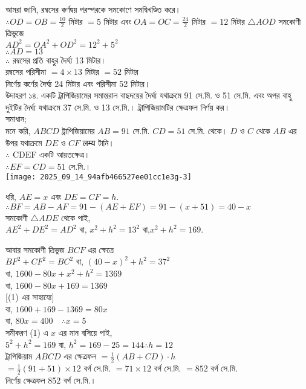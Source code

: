 \documentclass[10pt]{article}
\begin{document}
আমরা জানি, রম্বসের কর্ণদ্বয় পরস্পরকে সমকোণে সমদ্বিখণ্ডিত করে।\\
\(\therefore O D=O B=\frac{10}{2}\) মিটার \(=5\) মিটার এবং \(O A=O C=\frac{24}{2}\) মিটার \(=12\) মিটার \(\triangle A O D\) সমকোণী ত্রিভুজে\\
\(A D^{2}=O A^{2}+O D^{2}=12^{2}+5^{2}\)\\
\(\therefore A D=13\)\\
\(\therefore\) রম্বসের প্রতি বাহুর দৈর্ঘ্য 13 মিটার।\\
রম্বসের পরিসীমা \(=4 \times 13\) মিটার \(=52\) মিটার\\
নির্ণেয় কর্ণের দৈর্ঘ্য 24 মিটার এবং পরিসীমা 52 মিটার।\\
উদাহরণ ১৪. একটি ট্রাপিজিয়ামের সমান্তরাল বাছদয়ের দৈর্ঘ্য যথাক্রমে 91 সে.মি. ও 51 সে.মি. এবং অপর বাহু দুইটির দৈর্ঘ্য যথাক্রমে 37 সে.মি. ও 13 সে.মি.। ট্রাপিজিয়ামটির ক্ষেত্রফল নির্ণয় কর।\\
সমাধান;\\
মনে করি, \(A B C D\) ট্রাপিজিয়ামের \(A B=91\) সে.মি. \(C D=51\) সে.মি. থেকে। \(D\) ও \(C\) থেকে \(A B\) এর উপর যথাক্রমে \(D E\) ও \(C F\) लम्य টানি।\\
\(\therefore\) CDEF একটি আয়তক্ষেত্র।\\
\(\therefore E F=C D=51\) সে.মি.।\\
\texttt{[image: 2025\_09\_14\_94afb466527ee01cc1e3g-3]}

ধরি, \(A E=x\) এবং \(D E=C F=h\).\\
\(\therefore B F=A B-A F=91-(A E+E F)=91-(x+51)=40-x\)\\
সমকোণী \(\triangle A D E\) থেকে পাই,\\
\(A E^{2}+D E^{2}=A D^{2}\) বা, \(x^{2}+h^{2}=13^{2}\) বা,\(x^{2}+h^{2}=169\).

আবার সমকোণী ত্রিভুজ \(B C F\) এর ক্ষেত্রে\\
\(B F^{2}+C F^{2}=B C^{2}\) বা, \((40-x)^{2}+h^{2}=37^{2}\)\\
বা, \(1600-80 x+x^{2}+h^{2}=1369\)\\
বা, \(1600-80 x+169=1369\)\\[0pt]
[(1) এর সাহায্যে]\\
বা, \(1600+169-1369=80 x\)\\
বা, \(80 x=400 \quad \therefore x=5\)\\
সমীকরণ (1) এ \(x\) এর মান বসিয়ে পাই,\\
\(5^{2}+h^{2}=169\) বা, \(h^{2}=169-25=144 \therefore h=12\)\\
ট্রাপিজিয়াম \(A B C D\) এর ক্ষেত্রফল \(=\frac{1}{2}(A B+C D) \cdot h\)\\
\(=\frac{1}{2}(91+51) \times 12\) বর্গ সে.মি. \(=71 \times 12\) বর্গ সে.মি. \(=852\) বর্গ সে.মি.\\
নির্ণেয় ক্ষেত্রফল 852 বর্গ সে.মি.।
\end{document}
